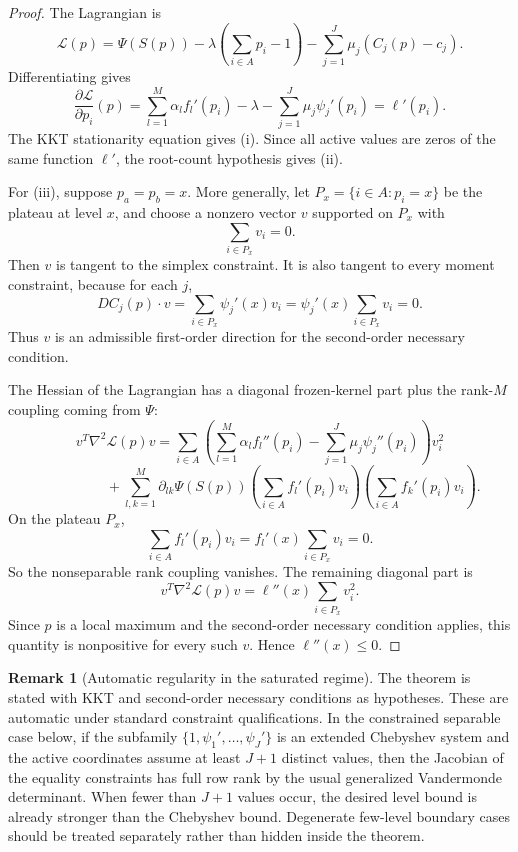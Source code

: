 \documentclass[11pt]{article}
\theoremstyle{definition}
\newtheorem{remark}[theorem]{Remark}
\begin{document}
\begin{proof}
The Lagrangian is
\[
  \mathcal L(p)=
  \Psi(S(p))-\lambda\left(\sum_{i\in A}p_i-1\right)
  -\sum_{j=1}^J\mu_j\left(C_j(p)-c_j\right).
\]
Differentiating gives
\[
  \frac{\partial \mathcal L}{\partial p_i}(p)=
  \sum_{l=1}^M\alpha_l f_l'(p_i)-\lambda-
  \sum_{j=1}^J\mu_j\psi_j'(p_i)=\ell'(p_i).
\]
The KKT stationarity equation gives (i).  Since all active values are zeros of the same function $\ell'$, the root-count hypothesis gives (ii).

For (iii), suppose $p_a=p_b=x$.  More generally, let $P_x=\{i\in A:p_i=x\}$ be the plateau at level $x$, and choose a nonzero vector $v$ supported on $P_x$ with
\[
  \sum_{i\in P_x}v_i=0.
\]
Then $v$ is tangent to the simplex constraint.  It is also tangent to every moment constraint, because for each $j$,
\[
  D C_j(p)\cdot v
  =\sum_{i\in P_x}\psi_j'(x)v_i
  =\psi_j'(x)\sum_{i\in P_x}v_i=0.
\]
Thus $v$ is an admissible first-order direction for the second-order necessary condition.

The Hessian of the Lagrangian has a diagonal frozen-kernel part plus the rank-$M$ coupling coming from $\Psi$:
\[
  v^T\nabla^2\mathcal L(p)v
  =\sum_{i\in A}\left(\sum_{l=1}^M\alpha_l f_l''(p_i)-
     \sum_{j=1}^J\mu_j\psi_j''(p_i)\right)v_i^2
\]
\[
  \hspace{2cm}+
  \sum_{l,k=1}^M \partial_{lk}\Psi(S(p))
  \left(\sum_{i\in A}f_l'(p_i)v_i\right)
  \left(\sum_{i\in A}f_k'(p_i)v_i\right).
\]
On the plateau $P_x$,
\[
  \sum_{i\in A}f_l'(p_i)v_i
  =f_l'(x)\sum_{i\in P_x}v_i=0.
\]
So the nonseparable rank coupling vanishes.  The remaining diagonal part is
\[
  v^T\nabla^2\mathcal L(p)v=\ell''(x)\sum_{i\in P_x}v_i^2.
\]
Since $p$ is a local maximum and the second-order necessary condition applies, this quantity is nonpositive for every such $v$.  Hence $\ell''(x)\le0$.
\end{proof}

\begin{remark}[Automatic regularity in the saturated regime]
The theorem is stated with KKT and second-order necessary conditions as hypotheses.  These are automatic under standard constraint qualifications.  In the constrained separable case below, if the subfamily $\{1,\psi_1',\ldots,\psi_J'\}$ is an extended Chebyshev system and the active coordinates assume at least $J+1$ distinct values, then the Jacobian of the equality constraints has full row rank by the usual generalized Vandermonde determinant.  When fewer than $J+1$ values occur, the desired level bound is already stronger than the Chebyshev bound.  Degenerate few-level boundary cases should be treated separately rather than hidden inside the theorem.
\end{remark}
\end{document}
